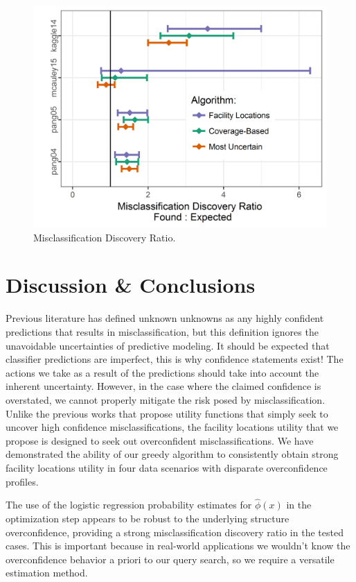 \documentclass[letterpaper]{article} %
\begin{document}
\begin{figure}[hbtp]
  \includegraphics[width=.49\textwidth]{../experimentsAndPlots/discoveryRatioPlaceholder.png}
  \caption{Misclassification Discovery Ratio.}
  \label{fig:sdr}
\end{figure}



\section{Discussion \& Conclusions}

Previous literature has defined unknown unknowns as any highly confident predictions that results in misclassification, but this definition ignores the unavoidable uncertainties of predictive modeling. It should be expected that classifier predictions are imperfect, this is why confidence statements exist! The actions we take as a result of the predictions should take into account the inherent uncertainty. However, in the case where the claimed confidence is overstated, we cannot properly mitigate the risk posed by misclassification. Unlike the previous works that propose utility functions that simply seek to uncover high confidence misclassifications, the facility locations utility that we propose is designed to seek out overconfident misclassifications. We have demonstrated the ability of our greedy algorithm to consistently obtain strong facility locations utility in four data scenarios with disparate overconfidence profiles. 

The use of the logistic regression probability estimates for $\hat{\phi}(x)$ in the optimization step appears to be robust to the underlying structure overconfidence, providing a strong misclassification discovery ratio in the tested cases. This is important because in real-world applications we wouldn’t know the overconfidence behavior a priori to our query search, so we require a versatile estimation method. 
\end{document}
